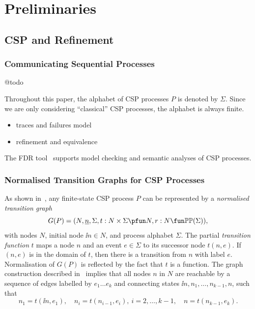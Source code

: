 \section{Preliminaries}
\label{section:preliminaries}



\subsection{CSP and Refinement}


\subsubsection*{Communicating Sequential Processes} @todo

Throughout this paper, the alphabet of CSP processes $P$ is denoted by $\Sigma$.
Since we are only considering ``classical'' CSP processes, the alphabet is always finite.

\begin{itemize}
  \item traces and failures model
  \item refinement and equivalence
\end{itemize}

The FDR tool~\cite{fdr} supports model checking and semantic analyses of CSP
processes.

\subsubsection*{Normalised Transition Graphs for CSP Processes}
\label{sec:ntg}

As shown in~\cite{Roscoe:1994:CME:197600}, any finite-state CSP process $P$
can be represented by a \emph{normalised transition graph}
$$
G(P) = ( N, \ii n, \Sigma, t : N\times\Sigma \pfun N, r : N \fun \mathbb{P}\mathbb{P}(\Sigma)),
$$
with nodes $N$, initial node $\ii n\in N$, and process alphabet $\Sigma$. The
partial \emph{transition function} $t$ maps a node $n$ and an event
$e\in\Sigma$ to its successor node $t(n,e)$. If $(n,e)$ is in the domain of
$t$, then there is a transition from $n$ with label $e$. Normalisation of
$G(P)$ is reflected by the fact that $t$ is a function. The graph construction
described in~\cite{Roscoe:1994:CME:197600} implies that all nodes $n$ in $N$ are reachable 
by a sequence of edges labelled by $e_1\dots e_k$ and connecting states 
$\ii n,n_1,\dots,n_{k-1},n$, such that
\[
n_1 = t(\ii n,e_1), \quad n_i = t(n_{i-1},e_i),\ i = 2,\dots,k-1,\quad
n= t(n_{k-1},e_k).
\]

